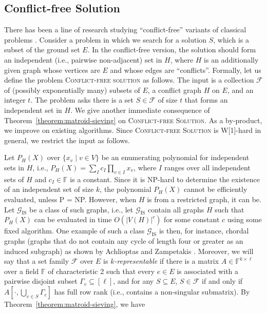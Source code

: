 \documentclass{theoretics}
\newcommand{\F}{\ensuremath{\mathbb F}\xspace}
\newcommand{\cF}{\ensuremath{\mathcal F}\xspace}
\begin{document}
\subsection{Conflict-free Solution}
\label{sec:conflict}

There has been a line of research studying ``conflict-free'' variants of classical problems \cite{AgrawalJKS20,DarmannPS09,DarmannPSW11,JacobMR21}.
Consider a problem in which we search for a solution $S$, which is a subset of the ground set $E$.
In the conflict-free version, the solution should form an independent (i.e., pairwise non-adjacent) set in $H$, where $H$ is an additionally given graph whose vertices are $E$ and whose edges are ``conflicts''.
Formally, let us define the problem \textsc{Conflict-free solution} as follows.
The input is a collection $\mathcal{F}$ of (possibly exponentially many) subsets of $E$, a conflict graph $H$ on $E$, and an integer $t$.
The problem asks there is a set $S \in \cF$ of size $t$ that forms an independent set in $H$.
We give another immediate consequence of Theorem~\ref{theorem:matroid-sieving} on \textsc{Conflict-free Solution}.
As a by-product, we improve on existing algorithms.
Since \textsc{Conflict-free Solution} is W[1]-hard in general, we restrict the input as follows.

\newcommand{\IS}{\text{IS}}

Let $P_H(X)$ over $\{ x_v \mid v \in V \}$ be an enumerating polynomial for independent sets in $H$, i.e., $P_H(X) = \sum_{I} c_I \prod_{v \in I} x_v$, where $I$ ranges over all independent sets of $H$ and $c_I \in \F$ is a constant.
Since it is NP-hard to determine the existence of an independent set of size $k$, the polynomial $P_H(X)$ cannot be efficiently evaluated, unless P = NP.
However, when $H$ is from a restricted graph, it can be.
Let $\mathcal{G}_{\IS}$ be a class of such graphs, i.e., let $\mathcal{G}_{\IS}$ contain all graphs $H$ such that $P_H(X)$ can be evaluated in
time $O(|V(H)|^c)$ for some constant $c$ using some fixed algorithm. 
One example of such a class $\mathcal{G}_{\IS}$ is then, for instance, chordal graphs (graphs that do not contain any cycle of length four or greater as an induced subgraph) as shown by Achlioptas and Zampetakis \cite{AchlioptasZ21}.
Moreover, we will say that a set family $\cF$ over $E$ is \emph{$k$-representable} if there is a matrix $A \in \F^{k \times \ell}$ over a field $\F$ of characteristic 2
such that every $e \in E$ is associated with a pairwise disjoint subset $\Gamma_e \subseteq [\ell]$, and for any $S \subseteq E$, $S \in \cF$ if and only if $A[\cdot, \bigcup_{e \in S} \Gamma_e]$ has full row rank (i.e., contains a non-singular submatrix).
By Theorem~\ref{theorem:matroid-sieving}, we have
\end{document}
